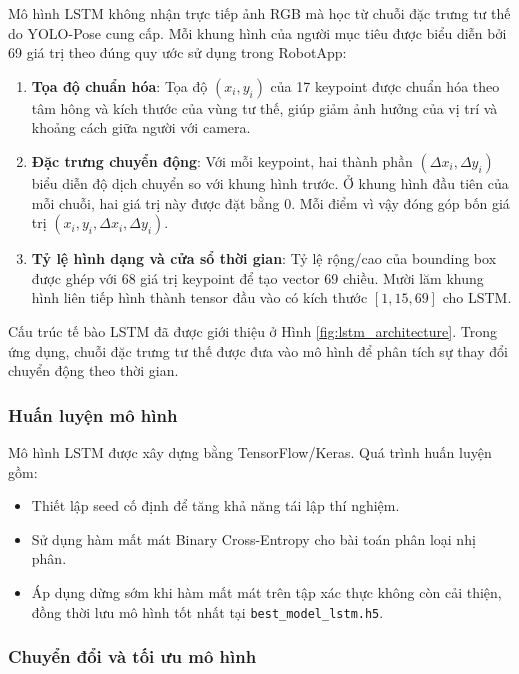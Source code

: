 Mô hình LSTM không nhận trực tiếp ảnh RGB mà học từ chuỗi đặc trưng tư thế do YOLO-Pose cung cấp. Mỗi khung hình của người mục tiêu được biểu diễn bởi 69 giá trị theo đúng quy ước sử dụng trong RobotApp:
\begin{enumerate}
    \item \textbf{Tọa độ chuẩn hóa}: Tọa độ $(x_i,y_i)$ của 17 keypoint được chuẩn hóa theo tâm hông và kích thước của vùng tư thế, giúp giảm ảnh hưởng của vị trí và khoảng cách giữa người với camera.
    \item \textbf{Đặc trưng chuyển động}: Với mỗi keypoint, hai thành phần $(\Delta x_i,\Delta y_i)$ biểu diễn độ dịch chuyển so với khung hình trước. Ở khung hình đầu tiên của mỗi chuỗi, hai giá trị này được đặt bằng 0. Mỗi điểm vì vậy đóng góp bốn giá trị $(x_i,y_i,\Delta x_i,\Delta y_i)$.
    \item \textbf{Tỷ lệ hình dạng và cửa sổ thời gian}: Tỷ lệ rộng/cao của bounding box được ghép với 68 giá trị keypoint để tạo vector 69 chiều. Mười lăm khung hình liên tiếp hình thành tensor đầu vào có kích thước $[1,15,69]$ cho LSTM.
\end{enumerate}

Cấu trúc tế bào LSTM đã được giới thiệu ở Hình \ref{fig:lstm_architecture}. Trong ứng dụng, chuỗi đặc trưng tư thế được đưa vào mô hình để phân tích sự thay đổi chuyển động theo thời gian.






\subsubsection{Huấn luyện mô hình}

Mô hình LSTM được xây dựng bằng TensorFlow/Keras. Quá trình huấn luyện gồm:
\begin{itemize}
    \item Thiết lập seed cố định để tăng khả năng tái lập thí nghiệm.
    \item Sử dụng hàm mất mát Binary Cross-Entropy cho bài toán phân loại nhị phân.
    \item Áp dụng dừng sớm khi hàm mất mát trên tập xác thực không còn cải thiện, đồng thời lưu mô hình tốt nhất tại \texttt{best\_model\_lstm.h5}.
\end{itemize}

\subsubsection{Chuyển đổi và tối ưu mô hình}

